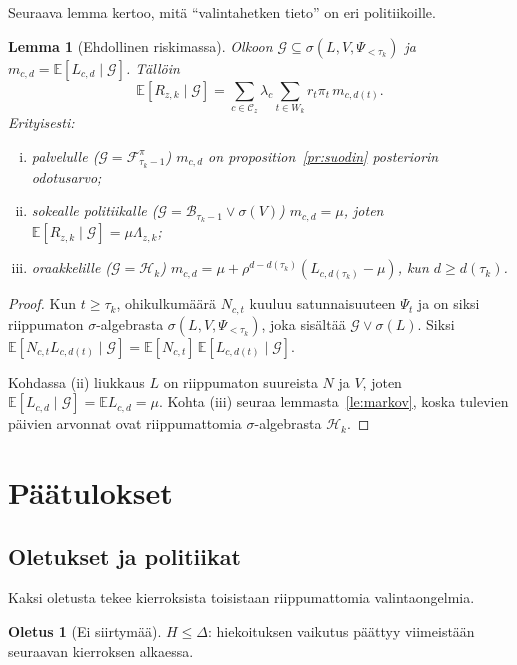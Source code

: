 \documentclass[11pt,a4paper]{article}
\theoremstyle{plain}
\newtheorem{lemma}{Lemma}
\theoremstyle{definition}
\newtheorem{oletus}{Oletus}
\theoremstyle{remark}
\newcommand{\E}{\mathbb{E}}
\newcommand{\cC}{\mathcal{C}}
\newcommand{\cF}{\mathcal{F}}
\newcommand{\cB}{\mathcal{B}}
\newcommand{\cG}{\mathcal{G}}
\newcommand{\cH}{\mathcal{H}}
\newcommand{\1}{\mathbf{1}}
\begin{document}
Seuraava lemma kertoo, mitä ``valintahetken tieto'' on eri politiikoille.

\begin{lemma}[Ehdollinen riskimassa]\label{le:ehdollinen}
Olkoon $\cG \subseteq \sigma(L, V, \Psi_{<\tau_k})$ ja $m_{c,d} = \E[L_{c,d} \mid \cG]$.
Tällöin
\[
  \E[R_{z,k} \mid \cG] = \sum_{c \in \cC_z} \lambda_c \sum_{t \in W_k} r_t \pi_t\, m_{c,d(t)}.
\]
Erityisesti:
\begin{enumerate}[(i)]
  \item palvelulle ($\cG = \cF^\pi_{\tau_k - 1}$) $m_{c,d}$ on
  proposition~\ref{pr:suodin} posteriorin odotusarvo;
  \item sokealle politiikalle ($\cG = \cB_{\tau_k-1} \vee \sigma(V)$)
  $m_{c,d} = \mu$, joten $\E[R_{z,k} \mid \cG] = \mu \Lambda_{z,k}$;
  \item oraakkelille ($\cG = \cH_k$)
  $m_{c,d} = \mu + \rho^{d - d(\tau_k)}(L_{c,d(\tau_k)} - \mu)$, kun $d \ge d(\tau_k)$.
\end{enumerate}
\end{lemma}

\begin{proof}
Kun $t \ge \tau_k$, ohikulkumäärä $N_{c,t}$ kuuluu satunnaisuuteen $\Psi_t$ ja
on siksi riippumaton $\sigma$-algebrasta $\sigma(L, V, \Psi_{<\tau_k})$, joka sisältää
$\cG \vee \sigma(L)$. Siksi
$\E[N_{c,t} L_{c,d(t)} \mid \cG] = \E[N_{c,t}]\,\E[L_{c,d(t)} \mid \cG]$.

Kohdassa (ii) liukkaus $L$ on riippumaton suureista $N$ ja $V$, joten
$\E[L_{c,d} \mid \cG] = \E L_{c,d} = \mu$. Kohta (iii) seuraa
lemmasta~\ref{le:markov}, koska tulevien päivien arvonnat ovat riippumattomia
$\sigma$-algebrasta $\cH_k$.
\end{proof}

\section{Päätulokset}\label{sec:lauseet}

\subsection{Oletukset ja politiikat}

Kaksi oletusta tekee kierroksista toisistaan riippumattomia valintaongelmia.

\begin{oletus}[Ei siirtymää]\label{ol:A}
$H \le \Delta$: hiekoituksen vaikutus päättyy viimeistään seuraavan kierroksen alkaessa.
\end{oletus}
\end{document}
